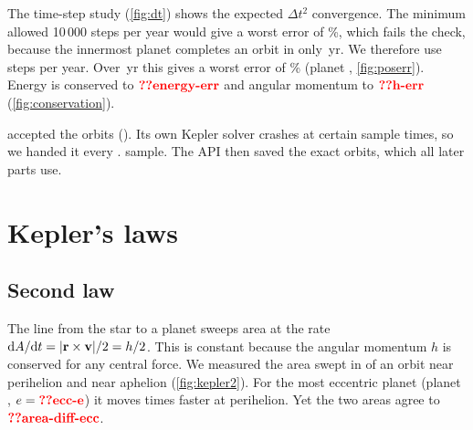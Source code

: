 \documentclass[aps,prd,twocolumn,nofootinbib,floatfix,superscriptaddress]{revtex4-2}
\begin{document}
The time-step study (\cref{fig:dt}) shows the expected $\Delta t^2$ convergence.
The minimum allowed 10\,000 steps per year would give a worst error of \%, which fails the check, because the innermost planet completes an orbit in only \,yr.
We therefore use  steps per year.
Over \,yr this gives a worst error of \% (planet , \cref{fig:poserr}).
Energy is conserved to $\val{energy-err}$ and angular momentum to $\val{h-err}$ (\cref{fig:conservation}).

 accepted the orbits ().
Its own Kepler solver crashes at certain sample times, so we handed it every . sample.
The API then saved the exact orbits, which all later parts use.


\section{Kepler's laws}\label{sec:kepler}
\subsection{Second law}
The line from the star to a planet sweeps area at the rate $\mathrm{d} A/\mathrm{d} t=|\mathbf{r}\times\mathbf{v}|/2=h/2$.
This is constant because the angular momentum $h$ is conserved for any central force.
We measured the area swept in  of an orbit near perihelion and near aphelion (\cref{fig:kepler2}).
For the most eccentric planet (planet , $e=\val{ecc-e}$) it moves  times faster at perihelion.
Yet the two areas agree to $\val{area-diff-ecc}$.
\end{document}
